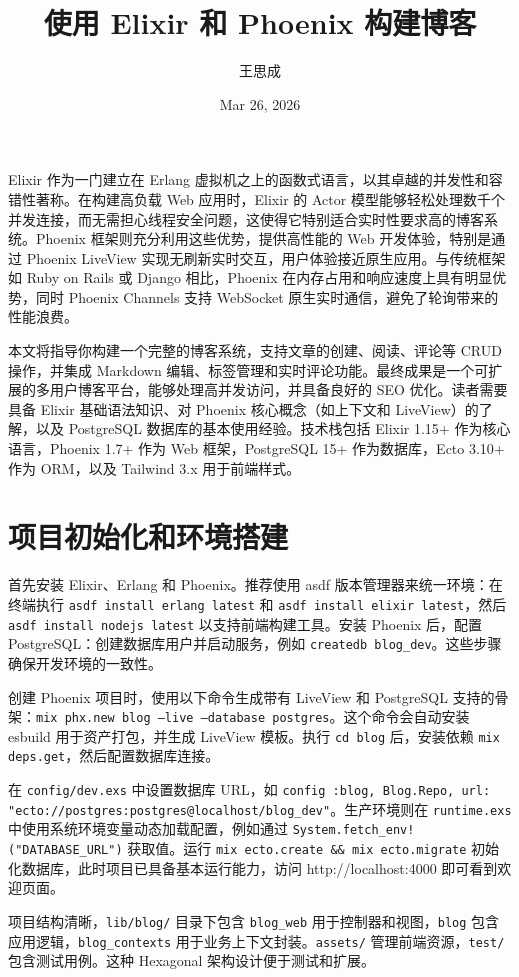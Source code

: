 \title{使用 Elixir 和 Phoenix 构建博客}
\author{王思成}
\date{Mar 26, 2026}
\maketitle
Elixir 作为一门建立在 Erlang 虚拟机之上的函数式语言，以其卓越的并发性和容错性著称。在构建高负载 Web 应用时，Elixir 的 Actor 模型能够轻松处理数千个并发连接，而无需担心线程安全问题，这使得它特别适合实时性要求高的博客系统。Phoenix 框架则充分利用这些优势，提供高性能的 Web 开发体验，特别是通过 Phoenix LiveView 实现无刷新实时交互，用户体验接近原生应用。与传统框架如 Ruby on Rails 或 Django 相比，Phoenix 在内存占用和响应速度上具有明显优势，同时 Phoenix Channels 支持 WebSocket 原生实时通信，避免了轮询带来的性能浪费。\par
本文将指导你构建一个完整的博客系统，支持文章的创建、阅读、评论等 CRUD 操作，并集成 Markdown 编辑、标签管理和实时评论功能。最终成果是一个可扩展的多用户博客平台，能够处理高并发访问，并具备良好的 SEO 优化。读者需要具备 Elixir 基础语法知识、对 Phoenix 核心概念（如上下文和 LiveView）的了解，以及 PostgreSQL 数据库的基本使用经验。技术栈包括 Elixir 1.15+ 作为核心语言，Phoenix 1.7+ 作为 Web 框架，PostgreSQL 15+ 作为数据库，Ecto 3.10+ 作为 ORM，以及 Tailwind 3.x 用于前端样式。\par
\chapter{项目初始化和环境搭建}
首先安装 Elixir、Erlang 和 Phoenix。推荐使用 asdf 版本管理器来统一环境：在终端执行 \texttt{asdf install erlang latest} 和 \texttt{asdf install elixir latest}，然后 \texttt{asdf install nodejs latest} 以支持前端构建工具。安装 Phoenix 后，配置 PostgreSQL：创建数据库用户并启动服务，例如 \texttt{createdb blog\_{}dev}。这些步骤确保开发环境的一致性。\par
创建 Phoenix 项目时，使用以下命令生成带有 LiveView 和 PostgreSQL 支持的骨架：\texttt{mix phx.new blog --live --database postgres}。这个命令会自动安装 esbuild 用于资产打包，并生成 LiveView 模板。执行 \texttt{cd blog} 后，安装依赖 \texttt{mix deps.get}，然后配置数据库连接。\par
在 \texttt{config/dev.exs} 中设置数据库 URL，如 \texttt{config :blog, Blog.Repo, url: "ecto://postgres:postgres@localhost/blog\_{}dev"}。生产环境则在 \texttt{runtime.exs} 中使用系统环境变量动态加载配置，例如通过 \texttt{System.fetch\_{}env!("DATABASE\_{}URL")} 获取值。运行 \texttt{mix ecto.create \&{}\&{} mix ecto.migrate} 初始化数据库，此时项目已具备基本运行能力，访问 http://localhost:4000 即可看到欢迎页面。\par
项目结构清晰，\texttt{lib/blog/} 目录下包含 \texttt{blog\_{}web} 用于控制器和视图，\texttt{blog} 包含应用逻辑，\texttt{blog\_{}contexts} 用于业务上下文封装。\texttt{assets/} 管理前端资源，\texttt{test/} 包含测试用例。这种 Hexagonal 架构设计便于测试和扩展。\par
